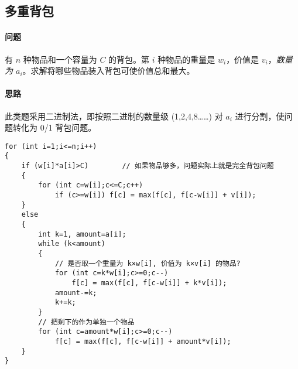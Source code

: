 \subsection{多重背包}
	\paragraph{问题} 有 $n$ 种物品和一个容量为 $C$ 的背包。第 $i$ 种物品的重量是 $w_i$，价值是 $v_i$，\emph{数量为 $a_i$}。求解将哪些物品装入背包可使价值总和最大。

	\paragraph{思路} 此类题采用二进制法，即按照二进制的数量级 (1,2,4,8\ldots\dots) 对 $a_i$ 进行分割，使问题转化为 0/1 背包问题。

\begin{lstlisting}			
for (int i=1;i<=n;i++)
{
	if (w[i]*a[i]>C)		// 如果物品够多，问题实际上就是完全背包问题
	{
		for (int c=w[i];c<=C;c++)
			if (c>=w[i]) f[c] = max(f[c], f[c-w[i]] + v[i]);
	}
	else
	{
		int k=1, amount=a[i];
		while (k<amount)
		{
			// 是否取一个重量为 k×w[i], 价值为 k×v[i] 的物品?
			for (int c=k*w[i];c>=0;c--)
				f[c] = max(f[c], f[c-w[i]] + k*v[i]);
			amount-=k;
			k+=k;
		}
		// 把剩下的作为单独一个物品
		for (int c=amount*w[i];c>=0;c--)
			f[c] = max(f[c], f[c-w[i]] + amount*v[i]);
	}
}
\end{lstlisting}

